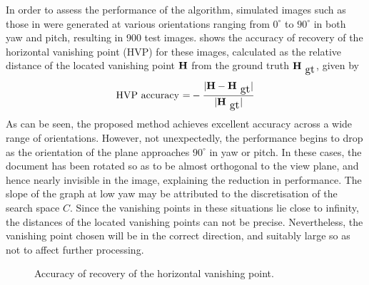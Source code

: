 In order to assess the performance of the algorithm, simulated images such as
those in  were generated at various orientations ranging from
$0^\circ$ to $90^\circ$ in both yaw and pitch, resulting in 900 test images. 
 shows the accuracy of recovery of the horizontal vanishing
point (HVP) for these images, 
calculated as the relative distance of the located vanishing point ${ \bf H }$ 
from the ground truth $\myvec{H}_{\mbox{\small gt}}$, given by
\begin{equation} 
\mbox{HVP accuracy =} -\frac{|\myvec{H}-\myvec{H}_{\mbox{\small gt}}|}{|\myvec{H}_{\mbox{\small gt}}|} \label{Haccuracy}
\end{equation}
As can be seen, the proposed method achieves excellent accuracy across a wide
range of orientations. However, not unexpectedly, the performance begins to
drop as the orientation of the plane approaches $90^\circ$ in yaw or pitch. In
these cases, the document has been rotated so as to be almost orthogonal to the
view plane, and hence nearly invisible in the image, explaining the reduction
in performance. The slope of the graph at low yaw may be attributed to the
discretisation of the search space $C$. Since the vanishing points in these
situations lie close to infinity, the distances of the located vanishing points
can not be precise. Nevertheless, the vanishing point chosen will be in the
correct direction, and suitably large so as not to affect further processing.


\begin{figure}[h]
\centering
\begin{center}
\hspace*{4mm}
\end{center}
\caption{Accuracy of recovery of the horizontal vanishing point.}
\end{figure}




